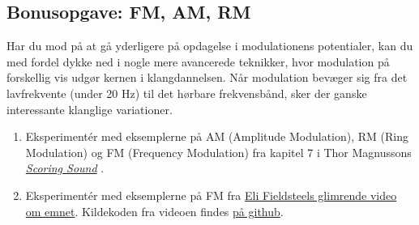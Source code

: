 \subsection{Bonusopgave: FM, AM, RM}

Har du mod på at gå yderligere på opdagelse i modulationens potentialer, kan du med fordel dykke ned i nogle mere avancerede teknikker, hvor modulation på forskellig vis udgør kernen i klangdannelsen. Når modulation bevæger sig fra det lavfrekvente (under 20 Hz) til det hørbare frekvensbånd, sker der ganske interessante klanglige variationer.

            \begin{enumerate}
            \item Eksperimentér med eksemplerne på AM (Amplitude Modulation), RM (Ring Modulation) og FM (Frequency Modulation) fra kapitel 7 i Thor Magnussons \href{https://leanpub.com/ScoringSound/read\#leanpub-auto-chapter-7---modulation}{\textit{Scoring Sound}} \parencite*{magnusson2021}.
\item Eksperimentér med eksemplerne på FM fra \href{https://www.youtube.com/watch?v=UoXMUQIqFk4\&list=PLPYzvS8A\_rTaNDweXe6PX4CXSGq4iEWYC\&index=22}{Eli Fieldsteels glimrende video om emnet}. Kildekoden fra videoen findes \href{https://github.com/elifieldsteel/SuperCollider-Tutorials/blob/master/full\%20video\%20scripts/21\_script.scd}{på github}. 
            \end{enumerate}